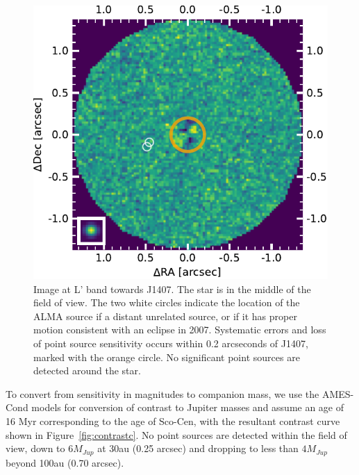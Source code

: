 \documentclass[twocolumn]{aa} %
\begin{document}
\begin{figure}[tbh]
\begin{center}
  \includegraphics[width=\columnwidth]{J1407_NACO_result.pdf}
\caption{\label{fig:naco}Image at L' band towards J1407. The star is in the middle of the field of view. The two white circles indicate the location of the ALMA source if a distant unrelated source, or if it has proper motion consistent with an eclipse in 2007. Systematic errors and loss of point source sensitivity occurs within 0.2 arcseconds of J1407, marked with the orange circle. No significant point sources are detected around the star.}

\end{center}
\end{figure}%

To convert from sensitivity in magnitudes to companion mass, we use the  AMES-Cond \citep{Baraffe03,Allard01} models for conversion of contrast to Jupiter masses and assume an age of 16 Myr corresponding to the age of Sco-Cen, with the resultant contrast curve shown in Figure~\ref{fig:contrastc}.
%
No point sources are detected within the field of view, down to $6M_{Jup}$ at 30au (0.25 arcsec) and dropping to less than $4M_{Jup}$ beyond 100au (0.70 arcsec).
\end{document}
